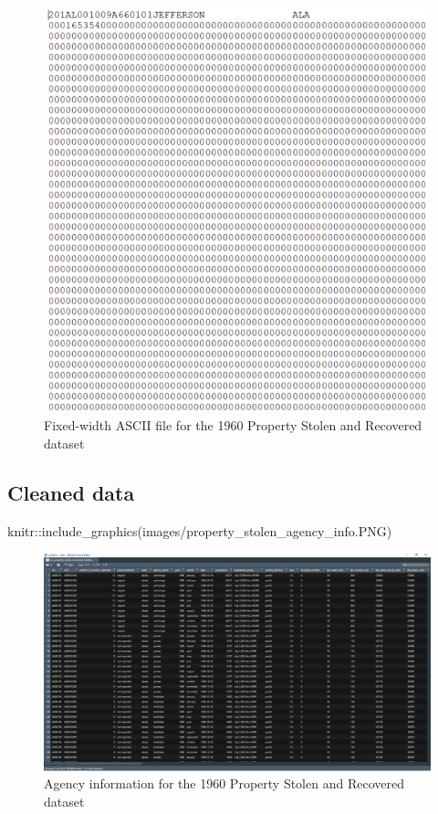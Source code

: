 \documentclass[
  12pt,
  openany]{book}
\newenvironment{Shaded}{\begin{snugshade}}{\end{snugshade}}
\newcommand{\FunctionTok}[1]{\textcolor[rgb]{0,0,0}{#1}}
\newcommand{\NormalTok}[1]{#1}
\newcommand{\SpecialCharTok}[1]{\textcolor[rgb]{0,0,0}{#1}}
\newcommand{\StringTok}[1]{\textcolor[rgb]{0.5,0.5,0.5}{#1}}
\begin{document}
\begin{figure}
\includegraphics[width=8.12in]{images/property_stolen_raw_ascii_1960} \caption{Fixed-width ASCII file for the 1960 Property Stolen and Recovered dataset}\label{fig:unnamed-chunk-1}
\end{figure}

\hypertarget{cleaned-data-5}{%
\subsection{Cleaned data}\label{cleaned-data-5}}

\begin{Shaded}
\begin{Highlighting}[]
\NormalTok{knitr}\SpecialCharTok{::}\FunctionTok{include\_graphics}\NormalTok{(}\StringTok{\textquotesingle{}images/property\_stolen\_agency\_info.PNG\textquotesingle{}}\NormalTok{)}
\end{Highlighting}
\end{Shaded}

\begin{figure}
\includegraphics[width=26.67in]{images/property_stolen_agency_info} \caption{Agency information for the 1960 Property Stolen and Recovered dataset}\label{fig:unnamed-chunk-2}
\end{figure}
\end{document}
